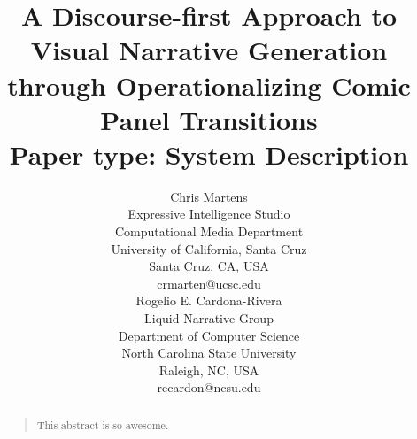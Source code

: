 \documentclass[letterpaper]{article}
\title{A Discourse-first Approach to Visual Narrative Generation through Operationalizing Comic Panel Transitions \\
Paper type: System Description}
\author{
	Chris Martens\\
	Expressive Intelligence Studio\\
	Computational Media Department\\
	University of California, Santa Cruz\\
	Santa Cruz, CA, USA\\
	crmarten@ucsc.edu\\
	\And
	Rogelio E. Cardona-Rivera\\
	Liquid Narrative Group\\
	Department of Computer Science\\
	North Carolina State University\\
	Raleigh, NC, USA\\
	recardon@ncsu.edu\\
}
\begin{document}
 
\maketitle
\begin{abstract}
	\begin{quote}
		This abstract is so awesome.
	\end{quote}
\end{abstract}





















\end{document}
